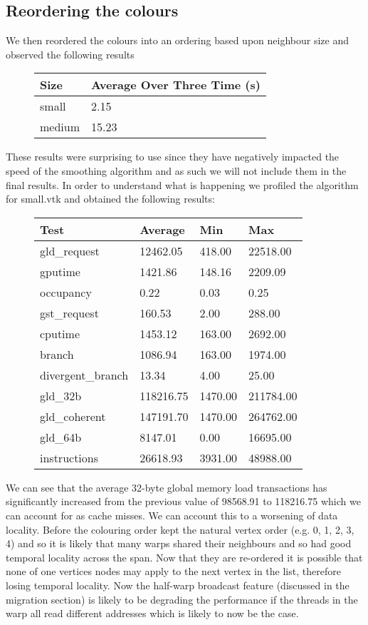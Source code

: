 \subsection*{Reordering the colours}
We then reordered the colours into an ordering based upon neighbour size and observed the following results\\
\begin{figure}[H]\centering \begin{tabular}{ l | l }
  \hline
  Size & Average Over Three Time (s) \\
  \hline
  \hline
  small & 2.15 \\
  medium & 15.23 \\
  \hline
\end{tabular} \end{figure}

These results were surprising to use since they have negatively impacted the speed of the smoothing algorithm and as such we will not include them in the final results. In order to understand what is happening we profiled the algorithm for small.vtk and obtained the following results:\\

\begin{figure}[H]\centering \begin{tabular}{ l | l | l | l}
\hline
Test & Average & Min & Max \\
\hline
\hline
gld\_request & 12462.05 & 418.00 & 22518.00 \\
gputime & 1421.86 & 148.16 & 2209.09 \\
occupancy & 0.22 & 0.03 & 0.25 \\
gst\_request & 160.53 & 2.00 & 288.00 \\
cputime & 1453.12 & 163.00 & 2692.00 \\
branch & 1086.94 & 163.00 & 1974.00 \\
divergent\_branch & 13.34 & 4.00 & 25.00 \\
gld\_32b & 118216.75 & 1470.00 & 211784.00 \\
gld\_coherent & 147191.70 & 1470.00 & 264762.00 \\
gld\_64b & 8147.01 & 0.00 & 16695.00 \\
instructions & 26618.93 & 3931.00 & 48988.00 \\
\hline
\end{tabular} \end{figure}

We can see that the average 32-byte global memory load transactions has significantly increased from the previous value of 98568.91 to 118216.75 which we can account for as cache misses. We can account this to a worsening of data locality. Before the colouring order kept the natural vertex order (e.g. 0, 1, 2, 3, 4) and so it is likely that many warps shared their neighbours and so had good temporal locality across the span.
Now that they are re-ordered it is possible that none of one vertices nodes may apply to the next vertex in the list, therefore losing temporal locality.
Now the half-warp broadcast feature (discussed in the migration section) is likely to be degrading the performance if the
threads in the warp all read different addresses which is likely to now be the case.
